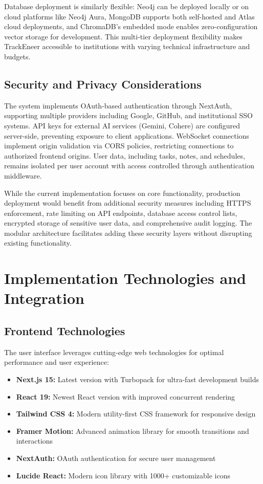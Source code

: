 \documentclass[conference]{IEEEtran}
\begin{document}
Database deployment is similarly flexible: Neo4j can be deployed locally or on cloud platforms like Neo4j Aura, MongoDB supports both self-hosted and Atlas cloud deployments, and ChromaDB's embedded mode enables zero-configuration vector storage for development. This multi-tier deployment flexibility makes TrackEneer accessible to institutions with varying technical infrastructure and budgets.

\subsection{Security and Privacy Considerations}
The system implements OAuth-based authentication through NextAuth, supporting multiple providers including Google, GitHub, and institutional SSO systems. API keys for external AI services (Gemini, Cohere) are configured server-side, preventing exposure to client applications. WebSocket connections implement origin validation via CORS policies, restricting connections to authorized frontend origins. User data, including tasks, notes, and schedules, remains isolated per user account with access controlled through authentication middleware.

While the current implementation focuses on core functionality, production deployment would benefit from additional security measures including HTTPS enforcement, rate limiting on API endpoints, database access control lists, encrypted storage of sensitive user data, and comprehensive audit logging. The modular architecture facilitates adding these security layers without disrupting existing functionality.

\section{Implementation Technologies and Integration}
\subsection{Frontend Technologies}
The user interface leverages cutting-edge web technologies for optimal performance and user experience:
\begin{itemize}
    \item \textbf{Next.js 15:} Latest version with Turbopack for ultra-fast development builds
    \item \textbf{React 19:} Newest React version with improved concurrent rendering
    \item \textbf{Tailwind CSS 4:} Modern utility-first CSS framework for responsive design
    \item \textbf{Framer Motion:} Advanced animation library for smooth transitions and interactions
    \item \textbf{NextAuth:} OAuth authentication for secure user management
    \item \textbf{Lucide React:} Modern icon library with 1000+ customizable icons
\end{itemize}
\end{document}
